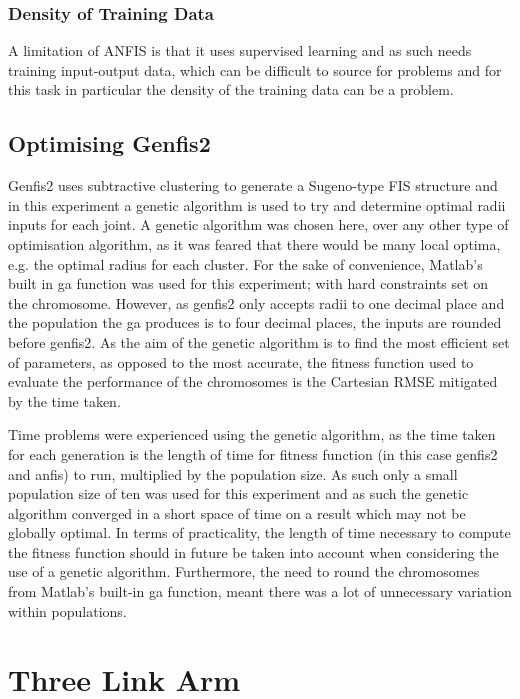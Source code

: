 \documentclass[11.5pt, twoside, a4paper]{article}
\begin{document}
\subsubsection{Density of Training Data}

A limitation of ANFIS is that it uses supervised learning and as such needs training input-output data, which can be difficult to source for problems and for this task in particular the density of the training data can be a problem. 

\subsection{Optimising Genfis2}
Genfis2 uses subtractive clustering to generate a Sugeno-type FIS structure \cite{genfis2} and in this experiment a genetic algorithm is used to try and determine optimal radii inputs for each joint. A genetic algorithm was chosen here, over any other type of optimisation algorithm, as it was feared that there would be many local optima, e.g. the optimal radius for each cluster. For the sake of convenience, Matlab's built in ga function was used for this experiment; with hard constraints set on the chromosome. However, as genfis2 only accepts radii to one decimal place and the population the ga produces is to four decimal places, the inputs are rounded before genfis2. As the aim of the genetic algorithm is to find the most efficient set of parameters, as opposed to the most accurate, the fitness function used to evaluate the performance of the chromosomes is the Cartesian RMSE mitigated by the time taken.

Time problems were experienced using the genetic algorithm, as the time taken for each generation is the length of time for fitness function (in this case genfis2 and anfis) to run, multiplied by the population size. As such only a small population size of ten was used for this experiment and as such the genetic algorithm converged in a short space of time on a result which may not be globally optimal. In terms of practicality, the length of time necessary to compute the fitness function should in future be taken into account when considering the use of a genetic algorithm. Furthermore, the need to round the chromosomes from Matlab's built-in ga function, meant there was a lot of unnecessary variation within populations.

\section{Three Link Arm}
\end{document}
